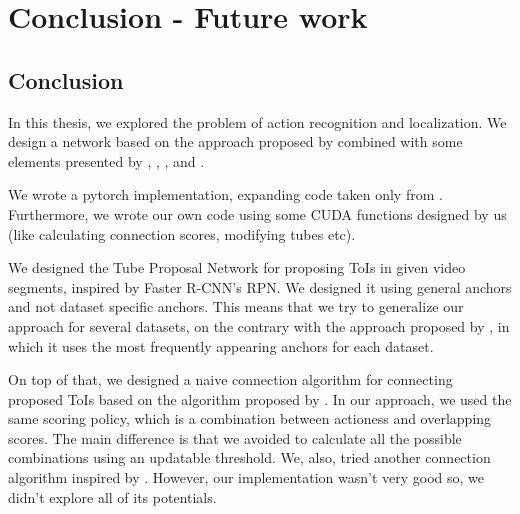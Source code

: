 


% 

\chapter{Conclusion - Future work}

\section{Conclusion}
In this thesis, we explored the problem of action recognition and localization. We design a network based on the approach proposed by \cite{DBLP:journals/corr/HouCS17}
combined with some elements presented by \cite{DBLP:journals/corr/abs-1712-09184}, \cite{Ren:2015:FRT:2969239.2969250}, \cite{Girshick:2015:FR:2919332.2920125},
\cite{DBLP:journals/corr/abs-1903-00304} and \cite{hara3dcnns}. \par

We wrote a pytorch implementation, expanding code taken only from \cite{jjfaster2rcnn}. Furthermore, we wrote our own code using some CUDA functions designed by us (like
calculating connection scores, modifying tubes etc). \par

We  designed the  Tube Proposal Network for proposing ToIs in given video segments, inspired by Faster R-CNN's RPN.
We designed it using general anchors and not dataset specific anchors. This means that we try to generalize our approach for several datasets, on the contrary with
the approach proposed by \cite{DBLP:journals/corr/abs-1712-09184}, in which it uses the most frequently appearing anchors for each dataset.

On top of that, we designed a naive connection algorithm for connecting  proposed ToIs based on the algorithm proposed by \cite{DBLP:journals/corr/abs-1712-09184}.
In our approach, we used the same scoring policy, which is a combination between actioness and overlapping scores. The main difference is that we avoided to calculate
all the possible combinations using an updatable threshold. We, also, tried another connection algorithm inspired by \cite{DBLP:journals/corr/abs-1903-00304}. However,
our implementation wasn't very good so, we didn't explore all of its potentials. \par

